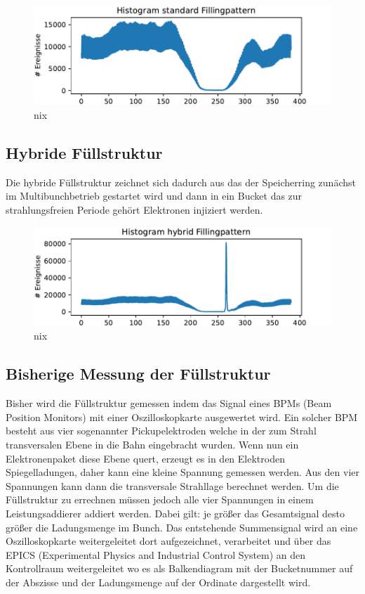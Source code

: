 \begin{figure}
    \centering
    \includegraphics{content/plots/standardfillingpattern.pdf}
    \caption{nix}
    \label{fig:standardfillingpattern}
  \end{figure}


\subsection{Hybride Füllstruktur}
\label{sec:HybrideFuellstruktur}
Die hybride Füllstruktur zeichnet sich dadurch aus das der Speicherring zunächst im Multibunchbetrieb
gestartet wird und dann in ein Bucket das zur strahlungsfreien Periode gehört Elektronen injiziert werden.

\begin{figure}
    \centering
    \includegraphics{content/plots/hybrid.pdf}
    \caption{nix }
    \label{fig:hybridfillingpattern}
  \end{figure}

\subsection{Bisherige Messung der Füllstruktur}
\label{sec:WasBisherGeschah}
Bisher wird die Füllstruktur gemessen indem das Signal eines BPMs (Beam Position Monitors) mit einer
Oszilloskopkarte ausgewertet wird. Ein solcher BPM besteht aus vier sogenannter Pickupelektroden
welche in der zum Strahl transversalen Ebene in die Bahn eingebracht wurden. Wenn nun ein Elektronenpaket
diese Ebene quert, erzeugt es in den Elektroden Spiegelladungen, daher kann eine kleine Spannung gemessen 
werden. Aus den vier Spannungen kann dann die transversale Strahllage berechnet werden. Um die Füllstruktur
zu errechnen müssen jedoch alle vier Spannungen in einem Leistungsaddierer addiert werden. Dabei gilt:
je größer das Gesamtsignal desto größer die Ladungsmenge im Bunch. Das entstehende 
Summensignal wird an eine Oszilloskopkarte weitergeleitet dort aufgezeichnet, verarbeitet und über das 
EPICS (Experimental Physics and Industrial Control System) an den Kontrollraum weitergeleitet wo es
als Balkendiagram mit der Bucketnummer auf der Abszisse und der Ladungsmenge auf der Ordinate dargestellt 
wird.



